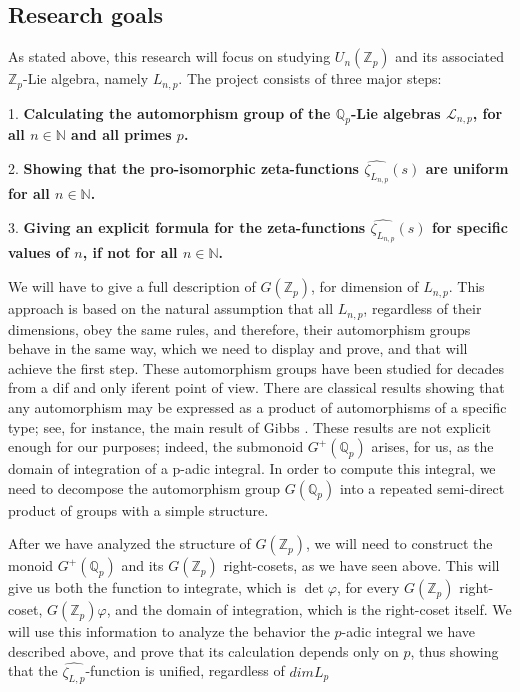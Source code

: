\documentclass[12pt]{article}
\begin{document}
\subsection{Research goals}
As stated above, this research will focus on studying $U_n(\mathbb{Z}_p)$ and its associated $\mathbb{Z}_p$-Lie algebra, namely $L_{n,p}$. The project consists of three major steps:\par
1. \textbf{Calculating the automorphism group of the $\mathbb{Q}_p$-Lie algebras $\mathcal{L}_{n,p}$, for all $n\in\mathbb{N}$ and all primes $p$.}\par
2. \textbf{Showing that the pro-isomorphic zeta-functions $\hat{\zeta_{L_{n,p}}}(s)$ are uniform for all $n\in\mathbb{N}$.}\par
3. \textbf{Giving an explicit formula for the zeta-functions $\hat{\zeta_{L_{n,p}}}(s)$ for specific values of $n$, if not for all $n\in\mathbb{N}$.}\par
We will have to give a full description of $G(\mathbb{Z}_p)$, for dimension of $L_{n,p}$. This approach is based on the natural assumption that all $L_{n,p}$, regardless of their dimensions, obey the same rules, and therefore, their automorphism groups behave in the same way, which we need to display and prove, and that will achieve the first step.
These automorphism groups have been studied for decades from a dif and only iferent point of view.  There are classical results showing that any automorphism may be expressed as a product of automorphisms of a specific type; see, for instance, the main result of Gibbs \cite{Gibbs}.  These results are not explicit enough for our purposes; indeed, the submonoid $G^+(\mathbb{Q}_p)$ arises, for us, as the domain of integration of a p-adic integral.  In order to compute this integral, we need to decompose the automorphism group $G(\mathbb{Q}_p)$ into a repeated semi-direct product of groups with a simple structure.
\par
After we have analyzed the structure of $G(\mathbb{Z}_p)$, we will need to construct the monoid $G^{+}(\mathbb{Q}_p)$ and its $G(\mathbb{Z}_p)$ right-cosets, as we have seen above. This will give us both the function to integrate, which is $\det\varphi$, for every $G(\mathbb{Z}_p)$ right-coset, $G(\mathbb{Z}_p)\varphi$, and the domain of integration, which is the right-coset itself. We will use this information to analyze the behavior the $p$-adic integral we have described above, and prove that its calculation depends only on $p$, thus showing that the $\hat{\zeta_{L,p}}$-function is unified, regardless of $dimL_p$
\end{document}
